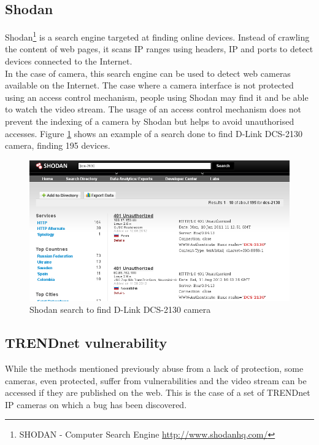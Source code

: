 \subsection{Shodan}
\label{sec:shodanhq}

Shodan\footnote{SHODAN - Computer Search Engine \url{http://www.shodanhq.com/}} is a search engine targeted at finding online devices.
Instead of crawling the content of web pages, it scans IP ranges using headers, IP and ports to detect devices connected to the Internet.\\

In the case of camera, this search engine can be used to detect web cameras available on the Internet.
The case where a camera interface is not protected using an access control mechanism, people using Shodan may find it and be able to watch the video stream.
The usage of an access control mechanism does not prevent the indexing of a camera by Shodan but helps to avoid unauthorised accesses.
Figure \ref{fig:shodan-dcs} shows an example of a search done to find D-Link DCS-2130 camera, finding 195 devices.

\begin{figure}[h]
  \centering
  \includegraphics[width=\textwidth]{images/shodan-dcs.png}
  \caption{Shodan search to find D-Link DCS-2130 camera}
  \label{fig:shodan-dcs}
\end{figure}

\subsection{TRENDnet vulnerability}
\label{sec:trendnet-hack}

While the methods mentioned previously abuse from a lack of protection, some cameras, even protected, suffer from vulnerabilities and the video stream can be accessed if they are published on the web.
This is the case of a set of TRENDnet IP cameras on which a bug has been discovered.\\

